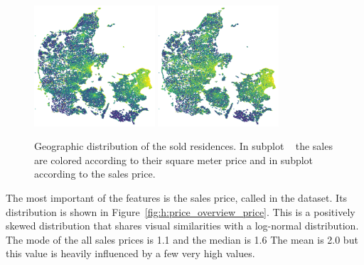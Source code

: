 \begin{figure}
  \centering
  \subfloat[\label{fig:h:geo_overview_sqm_price}]{\,}
  \includegraphics[draft=false, width=0.4\textwidth]{figures/housing/Denmark_Overview_SqmPrice.png}\hfil
  \subfloat[\label{fig:h:geo_overview_sales_price}]{\,}
  \includegraphics[draft=false, width=0.4\textwidth]{figures/housing/Denmark_Overview_SalesPrice.png}
  \caption[Distributions for the housing price dataset]{Geographic distribution of the sold residences. 
           In subplot ~\protect{} the sales are colored according to their square meter price and in subplot ~\protect{} according to the sales price. 
           }
  \label{fig:h:geo_overview}
  \vspace{\abovecaptionskip}
\end{figure}

The most important of the features is the sales price, called  in the dataset. Its distribution is shown in Figure~\ref{fig:h:price_overview_price}. This is a positively skewed distribution that shares visual similarities with a log-normal distribution. The mode of the all sales prices is \SI{1.1}{\Mkr} and the median is \SI{1.6}{\Mkr} The mean is \SI{2.0}{\Mkr} but this value is heavily influenced by a few very high values. 

